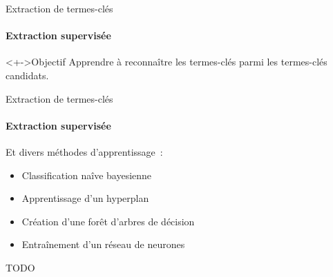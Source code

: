   \begin{frame}{Extraction de termes-clés}\framesubtitle{Extraction supervisée}
    \begin{block}<+->{Objectif}
      Apprendre à reconnaître les termes-clés parmi les termes-clés candidats.
    \end{block}

    \vspace{1em}

  \end{frame}

  \begin{frame}[t]{Extraction de termes-clés}\framesubtitle{Extraction supervisée}
    Et divers méthodes d'apprentissage~:
    \begin{itemize}
      \item{Classification naîve bayesienne}
      \item<3->{Apprentissage d'un hyperplan}
      \item<5->{Création d'une forêt d'arbres de décision}
      \item<7->{Entraînement d'un réseau de neurones}
    \end{itemize}

    \begin{center}
      \vfill{}

      TODO

      \vfill{}

    \end{center}
  \end{frame}

